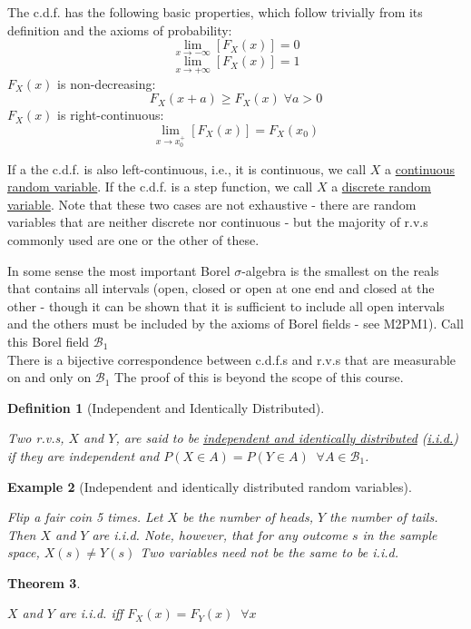 \documentclass[12pt,a4paper]{article}
\newtheorem{thm}{Theorem}[subsection]
\newtheorem{defn}[thm]{Definition}
\newtheorem{ex}[thm]{Example}
\begin{document}
The c.d.f. has the following basic properties, which follow trivially from its definition and the axioms of probability:
$$\lim_{x \rightarrow - \infty}[F_X(x)] = 0$$
$$\lim_{x \rightarrow + \infty}[F_X(x)] = 1$$
$F_X(x)$ is non-decreasing: $$F_X(x + a) \geq F_X(x)\; \forall a > 0$$
$F_X(x)$ is right-continuous: $$\lim_{x \rightarrow x_0^+}[F_X(x)] = F_X(x_0)$$

If a the c.d.f. is also left-continuous, i.e., it is continuous, we call $X$ a \underline{continuous random variable}. If the c.d.f. is a step function, we call $X$ a \underline{discrete random variable}. Note that these two cases are not exhaustive - there are random variables that are neither discrete nor continuous - but the majority of r.v.s commonly used are one or the other of these.

In some sense the most important Borel $\sigma$-algebra is the smallest on the reals that contains all intervals (open, closed or open at one end and closed at the other - though it can be shown that it is sufficient to include all open intervals and the others must be included by the axioms of Borel fields - see M2PM1). Call this Borel field $\mathcal{B}_1$\\
\indent There is a bijective correspondence between c.d.f.s and r.v.s that are measurable on and only on $\mathcal{B}_1$ The proof of this is beyond the scope of this course.

\begin{defn}[Independent and Identically Distributed]$\;$\par
\vspace{1cm}

Two r.v.s, $X$ and $Y$, are said to be \underline{independent and identically distributed} (\underline{i.i.d.}) if they are independent and $P(X \in A) = P(Y \in A)\;\;\forall A \in \mathcal{B}_1$.
\end{defn}

\begin{ex}[Independent and identically distributed random variables]$\;$\par
\vspace{1cm}

Flip a fair coin 5 times. Let $X$ be the number of heads, $Y$ the number of tails. Then $X$ and $Y$ are i.i.d. Note, however, that for any outcome $s$ in the sample space, $X(s) \neq Y(s)$ Two variables need not be the same to be i.i.d.
\end{ex}

\begin{thm}$\;$\par
\vspace{1cm}

$X$ and $Y$ are i.i.d. iff $F_X(x) = F_Y(x) \;\;\forall x$
\end{thm}
\end{document}
